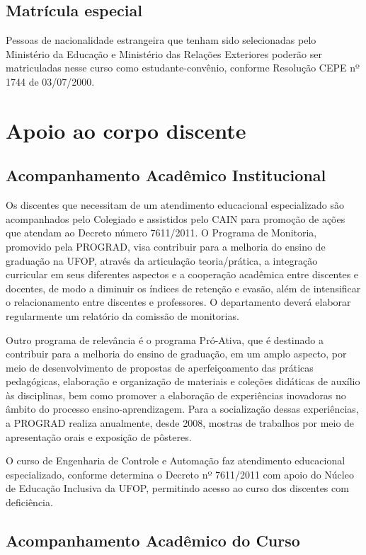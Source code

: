 \documentclass[
	12pt,				%
	openright,			%
	oneside,			%
	a4paper,			%
	english,			%
	brazil				%
	]{abntex2}
\begin{document}
\section{Matrícula especial}
Pessoas de nacionalidade estrangeira que tenham sido selecionadas pelo Ministério da Educação e Ministério das Relações Exteriores poderão ser matriculadas nesse curso como estudante-convênio, conforme Resolução CEPE nº 1744 de 03/07/2000.

\chapter{Apoio ao corpo discente}
%
\section{Acompanhamento Acadêmico Institucional}
Os discentes que necessitam de um atendimento educacional especializado são acompanhados pelo Colegiado e assistidos pelo CAIN para promoção de ações que atendam ao Decreto número 7611/2011.
O Programa de Monitoria, promovido pela PROGRAD, visa contribuir para a melhoria do ensino de graduação na UFOP, através da articulação teoria/prática, a integração curricular em seus diferentes aspectos e a cooperação acadêmica entre discentes e docentes, de modo a diminuir os índices de retenção e evasão, além de intensificar o relacionamento entre discentes e professores. O departamento deverá elaborar regularmente um relatório da comissão de monitorias.

Outro programa de relevância é o programa Pró-Ativa, que é destinado a contribuir para a melhoria do ensino de graduação, em um amplo aspecto, por meio de desenvolvimento de propostas de aperfeiçoamento das práticas pedagógicas, elaboração e organização de materiais e coleções didáticas de auxílio às disciplinas, bem como promover a elaboração de experiências inovadoras no âmbito do processo ensino-aprendizagem. Para a socialização dessas experiências, a PROGRAD realiza anualmente, desde 2008, mostras de trabalhos por meio de apresentação orais e exposição de pôsteres.

O curso de Engenharia de Controle e Automação faz atendimento educacional especializado, conforme determina o Decreto nº 7611/2011 com apoio do Núcleo de Educação
Inclusiva da UFOP, permitindo acesso ao curso dos discentes com deficiência.

\section{Acompanhamento Acadêmico do Curso}
%
\end{document}
